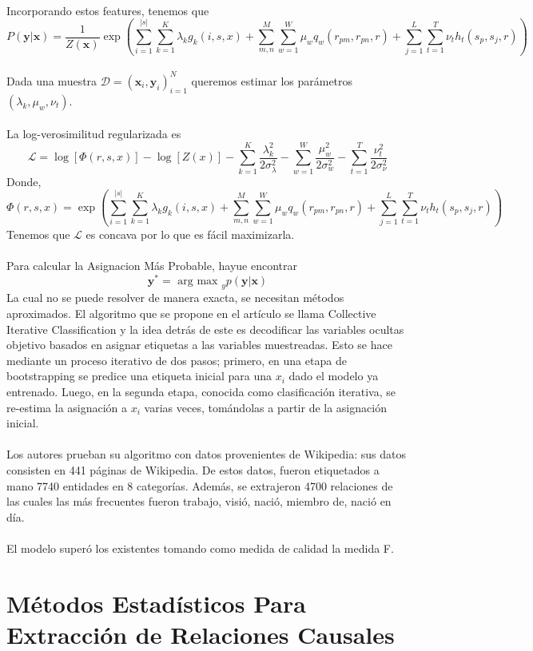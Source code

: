 \documentclass[11pt]{article}
\theoremstyle{plain}
\begin{document}
\\
Incorporando estos features, tenemos que 
\[P(\mathbf{y} | \mathbf{x}) = \frac{1}{Z(\mathbf{x})} \exp \left( \sum_{i=1}^{|s|} \sum_{k=1}^K \lambda_k g_k(i,s,x) + \sum_{m,n}^M \sum_{w=1}^W \mu_w q_w (r_{pm},r_{pn},r) + \sum_{j=1}^L \sum_{t=1}^T  \nu_t h_t(s_p,s_j,r) \right) \]
\\
Dada una muestra $\mathcal{D}= (\mathbf{x}_i, \mathbf{y}_i)_{i=1}^N$ queremos estimar los parámetros $(\lambda_k,\mu_w,\nu_t)$.\\
\\
La log-verosimilitud regularizada es
\[ \mathcal{L} = \log [\Phi(r,s,x)] - \log [Z(x)] - \sum_{k=1}^K \frac{\lambda_k^2}{2 \sigma_\lambda^2} - \sum_{w=1}^W \frac{\mu_w^2}{2 \sigma_w^2} - \sum_{t=1}^T \frac{\nu_t^2}{2 \sigma_\nu^2} \]
Donde,
\[ \Phi(r,s,x) = \exp (\sum_{i=1}^{|s|} \sum_{k=1}^K \lambda_k g_k(i,s,x) + \sum_{m,n}^M \sum_{w=1}^W \mu_w q_w (r_{pm},r_{pn},r) + \sum_{j=1}^L \sum_{t=1}^T  \nu_t h_t(s_p,s_j,r)) \]
Tenemos que $\mathcal{L}$ es concava por lo que es fácil maximizarla.\\
\\
Para calcular la Asignacion Más Probable, hayue encontrar
\[ \mathbf{y}^\ast = \textrm{ arg max }_y p(\mathbf{y}| \mathbf{x})\]
La cual no se puede resolver de manera exacta, se necesitan métodos aproximados. El algoritmo que se propone en el artículo se llama Collective Iterative Classification y la idea detrás de este es decodificar las variables ocultas objetivo basados en asignar etiquetas a las variables muestreadas. Esto se hace mediante un proceso iterativo de dos pasos; primero, en una etapa de bootstrapping se predice una etiqueta inicial para una $x_i$ dado el modelo ya entrenado. Luego, en la segunda etapa, conocida como clasificación iterativa, se re-estima la asignación a $x_i$ varias veces, tomándolas a partir de la asignación inicial.\\
\\
Los autores prueban su algoritmo con datos provenientes de Wikipedia: sus datos consisten en 441 páginas de Wikipedia. De estos datos, fueron etiquetados a mano 7740 entidades en 8 categorías. Además, se extrajeron 4700 relaciones de las cuales las más frecuentes fueron trabajo, visió, nació, miembro de, nació en día.\\
\\
El modelo superó los existentes tomando como medida de calidad la medida F. 
\section{Métodos Estadísticos Para Extracción de Relaciones Causales}
\end{document}
